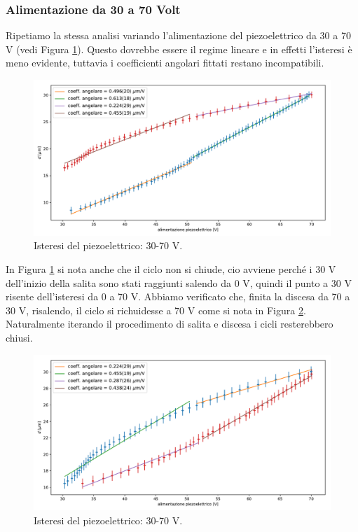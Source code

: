 \documentclass[a4paper]{article}
\begin{document}
\subsubsection{Alimentazione da 30 a 70 Volt}
Ripetiamo la stessa analisi variando l'alimentazione del piezoelettrico da 30 a 70 V (vedi Figura \ref{fig:30-70-1}). Questo dovrebbe essere il regime lineare e in effetti l'isteresi è meno evidente, tuttavia i coefficienti angolari fittati restano incompatibili.
\begin{figure}[H]
	\includegraphics[width=1\textwidth]{isteresi_30-70-1.pdf}
	\caption{Isteresi del piezoelettrico: 30-70 V.}
	\label{fig:30-70-1}
\end{figure}
 In Figura \ref{fig:30-70-1} si nota anche che il ciclo non si chiude, cio avviene perché i 30 V dell'inizio della salita sono stati raggiunti salendo da 0 V, quindi il punto a 30 V risente dell'isteresi da 0 a 70 V. Abbiamo verificato che, finita la discesa da 70 a 30 V, risalendo, il ciclo si richuidesse a 70 V come si nota in Figura \ref{fig:30-70-2}. Naturalmente iterando il procedimento di salita e discesa i cicli resterebbero chiusi.
 \begin{figure}[H]
 	\includegraphics[width=1\textwidth]{isteresi_30-70-2.pdf}
 	\caption{Isteresi del piezoelettrico: 30-70 V.}
 	\label{fig:30-70-2}
 \end{figure}
\end{document}
